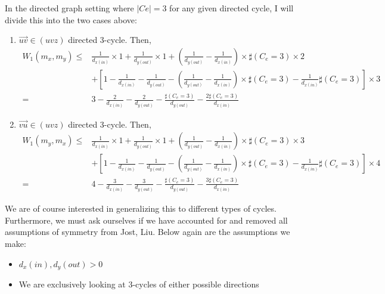\documentclass{Dissertate}
\theoremstyle{definition}
\theoremstyle{definition} %
\theoremstyle{definition}
\begin{document}
In the directed graph setting where $|Ce| = 3$ for any given directed cycle, I will divide this into the two cases above: 
\begin{enumerate}
    \item $\overrightarrow{uv} \in (uvz)$ directed 3-cycle.
Then,
$$
\begin{aligned}
W_{1}\left(m_{x}, m_{y}\right) \leq & \frac{1}{d_{x(in)}} \times 1+\frac{1}{d_{y(out)}} \times 1+\left(\frac{1}{d_{y(out)}}-\frac{1}{d_{x(in)}}\right) \times \sharp(C_e = 3) \times 2 \\
& +\left[1-\frac{1}{d_{x(in)}}-\frac{1}{d_{y(out)}}-\left(\frac{1}{d_{y(out)}}-\frac{1}{d_{x(in)}}\right) \times \sharp(C_e = 3)-\frac{1}{d_{x(in)}} \sharp(C_e = 3)\right] \times 3 \\
= & 3-\frac{2}{d_{x(in)}}-\frac{2}{d_{y(out)}}-\frac{\sharp(C_e = 3)}{d_{y(out)}}-\frac{2 \sharp(C_e = 3)}{d_{x(in)}} 
\end{aligned}
$$
    \item $\overrightarrow{vu} \in (uvz)$ directed 3-cycle.
Then, 
$$
\begin{aligned}
W_{1}\left(m_{y}, m_{x}\right) \leq & \frac{1}{d_{x(in)}} \times 1+\frac{1}{d_{y(out)}} \times 1+\left(\frac{1}{d_{y(out)}}-\frac{1}{d_{x(in)}}\right) \times \sharp(C_e = 3) \times 3 \\
& +\left[1-\frac{1}{d_{x(in)}}-\frac{1}{d_{y(out)}}-\left(\frac{1}{d_{y(out)}}-\frac{1}{d_{x(in)}}\right) \times \sharp(C_e = 3)-\frac{1}{d_{x(in)}} \sharp(C_e = 3)\right] \times 4 \\
= & 4-\frac{3}{d_{x(in)}}-\frac{3}{d_{y(out)}}-\frac{\sharp(C_e = 3)}{d_{y(out)}}-\frac{3 \sharp(C_e = 3)}{d_{x(in)}}
\end{aligned}
$$
\end{enumerate}
We are of course interested in generalizing this to different types of cycles. Furthermore, we must ask ourselves if we have accounted for and removed all assumptions of symmetry from Jost, Liu. Below again are the assumptions we make:
\begin{itemize}
    \item $d_x(in), d_y(out) > 0$
    \item We are exclusively looking at 3-cycles of either possible directions
\end{itemize}
\end{document}
